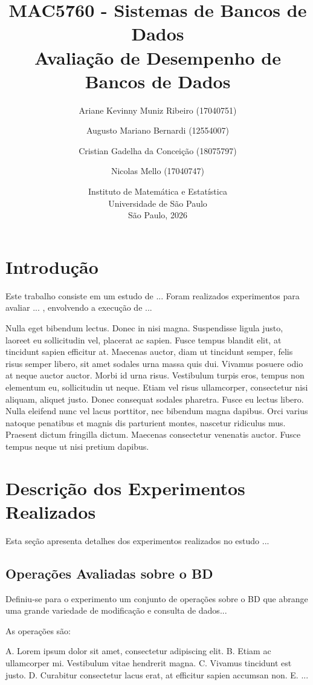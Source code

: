 \documentclass[12pt,a4paper]{article}
\title{MAC5760 - Sistemas de Bancos de Dados \\ \large Avaliação de Desempenho de Bancos de Dados}
\author{Ariane Kevinny Muniz Ribeiro (17040751) \and Augusto Mariano Bernardi (12554007) \and Cristian Gadelha da Conceição (18075797) \and Nicolas Mello (17040747)}
\date{Instituto de Matemática e Estatística \\ Universidade de São Paulo \\ São Paulo, 2026}
\begin{document}
\maketitle
\tableofcontents
\newpage

\section{Introdução}
Este trabalho consiste em um estudo de ... Foram realizados experimentos para avaliar ... , envolvendo a execução de ...

Nulla eget bibendum lectus. Donec in nisi magna. Suspendisse ligula justo, laoreet eu sollicitudin vel, placerat ac sapien. Fusce tempus blandit elit, at tincidunt sapien efficitur at. Maecenas auctor, diam ut tincidunt semper, felis risus semper libero, sit amet sodales urna massa quis dui. Vivamus posuere odio at neque auctor auctor. Morbi id urna risus. Vestibulum turpis eros, tempus non elementum eu, sollicitudin ut neque. Etiam vel risus ullamcorper, consectetur nisi aliquam, aliquet justo. Donec consequat sodales pharetra. Fusce eu lectus libero. Nulla eleifend nunc vel lacus porttitor, nec bibendum magna dapibus. Orci varius natoque penatibus et magnis dis parturient montes, nascetur ridiculus mus. Praesent dictum fringilla dictum. Maecenas consectetur venenatis auctor. Fusce tempus neque ut nisi pretium dapibus.

\section{Descrição dos Experimentos Realizados}
Esta seção apresenta detalhes dos experimentos realizados no estudo ...

\subsection{Operações Avaliadas sobre o BD}
Definiu-se para o experimento um conjunto de operações sobre o BD que abrange uma grande variedade de modificação e consulta de dados...

As operações são:
\begin{itemize}
    A. Lorem ipsum dolor sit amet, consectetur adipiscing elit.
    B. Etiam ac ullamcorper mi. Vestibulum vitae hendrerit magna.
    C. Vivamus tincidunt est justo.
    D. Curabitur consectetur lacus erat, at efficitur sapien accumsan non.
    E. ...
\end{itemize}
\end{document}
